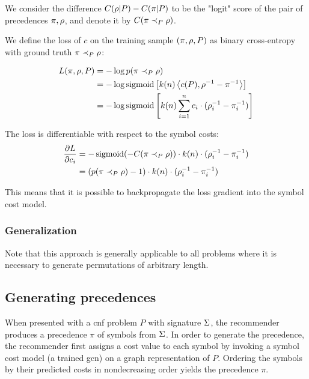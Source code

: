 We consider the difference $C(\rho | P) - C(\pi | P)$
to be the "logit" score of the pair of precedences $\pi, \rho$,
and denote it by $C(\pi \prec_{P} \rho)$.

We define the loss of $c$ on the training sample $(\pi, \rho, P)$ as binary cross-entropy
with ground truth $\pi \prec_{P} \rho$:

\begin{align*}
L(\pi, \rho, P)
&= - \log p(\pi \prec_{P} \rho) \\
&= - \log \operatorname{sigmoid} \left[k(n) \left<c(P),\rho^{-1} - \pi^{-1}\right>\right] \\
&= - \log \operatorname{sigmoid} \left[k(n) \sum_{i=1}^n c_i \cdot (\rho^{-1}_i - \pi^{-1}_i)\right]
\end{align*}

The loss is differentiable with respect to the symbol costs:
\begin{align*}
\frac{\partial L}{\partial c_i}
&= -\operatorname{sigmoid}(-C(\pi \prec_{P} \rho)) \cdot k(n) \cdot (\rho^{-1}_i - \pi^{-1}_i) \\
&= (p(\pi \prec_{P} \rho) - 1) \cdot k(n) \cdot (\rho^{-1}_i - \pi^{-1}_i)
\end{align*}

This means that it is possible to backpropagate the loss gradient into the symbol cost model. 

\subsubsection{Generalization}

Note that this approach is generally applicable to all problems where it is necessary to generate permutations of arbitrary length.


\subsection{Generating precedences}
\label{sec:generating}

When presented with a \gls{cnf} problem $P$ with signature $\operatorname{\Sigma}$,
the recommender produces a precedence $\pi$ of symbols from $\operatorname{\Sigma}$.
In order to generate the precedence,
the recommender first assigns a cost value to each symbol
by invoking a symbol cost model (a trained \gls{gcn}) on a graph representation of $P$.
Ordering the symbols by their predicted costs in nondecreasing order yields the precedence $\pi$.

